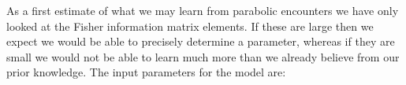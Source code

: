 As a first estimate of what we may learn from parabolic encounters we have only looked at the Fisher information matrix elements. If these are large then we expect we would be able to precisely determine a parameter, whereas if they are small we would not be able to learn much more than we already believe from our prior knowledge. The input parameters for the model are:
